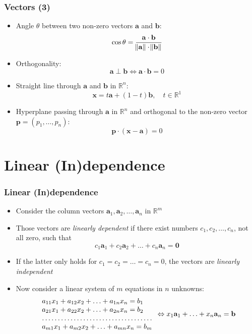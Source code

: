 \documentclass[10pt]{beamer}
\theoremstyle{definition}
\begin{document}
\begin{frame}[fragile]
\frametitle{Vectors (3)}
\begin{itemize}
	\item Angle $\theta$ between two non-zero vectors $\mathbf{a}$ and $\mathbf{b}$:
	\[
		\cos \theta = \dfrac{\mathbf{a\cdot b}}{\norm{\mathbf{a}}\cdot \norm{\mathbf{b}}}
	\]
	\item Orthogonality:
	\[
		\mathbf{a} \perp \mathbf{b} \Leftrightarrow \mathbf{a\cdot b} = 0
	\]
	\item Straight line through $\mathbf{a}$ and $\mathbf{b}$ in $\mathbb{R}^{n}$:
	\[
		\mathbf{x} = t\mathbf{a} + (1-t)\mathbf{b},\quad t \in \mathbb{R}^{1}
	\]
	\item Hyperplane passing through $\mathbf{a}$ in $\mathbb{R}^{n}$ and orthogonal to the non-zero vector $\mathbf{p} = (p_{1},\ldots, p_{n})$:
	\[
		\mathbf{p\cdot(x - a)} = 0
	\]
\end{itemize}
\end{frame}

\section{Linear (In)dependence}
\begin{frame}[fragile]
\frametitle{Linear (In)dependence}
\begin{itemize}
	\item Consider the column vectors $\mathbf{a}_{1}, \mathbf{a}_{2}, \ldots, \mathbf{a}_{n}$ in $\mathbb{R}^{m}$
	\item Those vectors are \textit{linearly dependent} if there exist numbers $c_{1}, c_{2},\ldots, c_{n}$, not all zero, such that
	\[
		c_{1}\mathbf{a}_{1} + c_{2}\mathbf{a}_{2} + \ldots + c_{n}\mathbf{a}_{n} = \mathbf{0}
	\]
	\item If the latter only holds for $c_{1} = c_{2} = \ldots = c_{n} = 0$, the vectors are \textit{linearly independent}
	\item Now consider a linear system of $m$ equations in $n$ unknowns:
	\[
		\begin{array}{lcl}
			a_{11}x_{1} + a_{12}x_{2} + \ldots + a_{1n}x_{n} = b_{1}\\
			a_{21}x_{1} + a_{22}x_{2} + \ldots + a_{2n}x_{n} = b_{2}\\
			\hdotsfor{1}\\
			a_{m1}x_{1} + a_{m2}x_{2} + \ldots + a_{mn}x_{n} = b_{m}\\
		\end{array} 
		\Leftrightarrow
		x_{1}\mathbf{a}_{1} + \ldots + x_{n}\mathbf{a}_{n} = \mathbf{b}
	\]
\end{itemize}
\end{frame}
\end{document}
